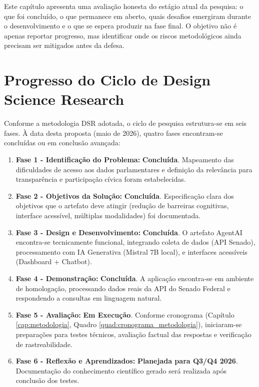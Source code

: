 Este capítulo apresenta uma avaliação honesta do estágio atual da pesquisa: o que foi concluído, o que permanece em aberto, quais desafios emergiram durante o desenvolvimento e o que se espera produzir na fase final. O objetivo não é apenas reportar progresso, mas identificar onde os riscos metodológicos ainda precisam ser mitigados antes da defesa.

\section{Progresso do Ciclo de Design Science Research}

Conforme a metodologia DSR adotada, o ciclo de pesquisa estrutura-se em seis fases. À data desta proposta (maio de 2026), quatro fases encontram-se concluídas ou em conclusão avançada:

\begin{enumerate}
    \item \textbf{Fase 1 - Identificação do Problema:} \textbf{Concluída}. Mapeamento das dificuldades de acesso aos dados parlamentares e definição da relevância para transparência e participação cívica foram estabelecidas.

    \item \textbf{Fase 2 - Objetivos da Solução:} \textbf{Concluída}. Especificação clara dos objetivos que o artefato deve atingir (redução de barreiras cognitivas, interface acessível, múltiplas modalidades) foi documentada.

    \item \textbf{Fase 3 - Design e Desenvolvimento:} \textbf{Concluída}. O artefato AgentAI encontra-se tecnicamente funcional, integrando coleta de dados (API Senado), processamento com IA Generativa (Mistral 7B local), e interfaces acessíveis (Dashboard + Chatbot).

    \item \textbf{Fase 4 - Demonstração:} \textbf{Concluída}. A aplicação encontra-se em ambiente de homologação, processando dados reais da API do Senado Federal e respondendo a consultas em linguagem natural.

    \item \textbf{Fase 5 - Avaliação:} \textbf{Em Execução}. Conforme cronograma (Capítulo \ref{cap:metodologia}, Quadro \ref{quad:cronograma_metodologia}), iniciaram-se preparações para testes técnicos, avaliação factual das respostas e verificação de rastreabilidade.

    \item \textbf{Fase 6 - Reflexão e Aprendizados:} \textbf{Planejada para Q3/Q4 2026}. Documentação do conhecimento científico gerado será realizada após conclusão dos testes.
\end{enumerate}


